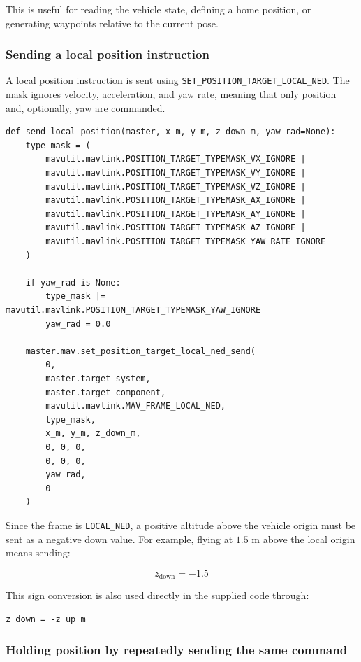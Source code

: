 This is useful for reading the vehicle state, defining a home position, or generating waypoints relative to the current pose. 

\subsubsection{Sending a local position instruction}

A local position instruction is sent using \texttt{SET\_POSITION\_TARGET\_LOCAL\_NED}. The mask ignores velocity, acceleration, and yaw rate, meaning that only position and, optionally, yaw are commanded.

\begin{verbatim}
def send_local_position(master, x_m, y_m, z_down_m, yaw_rad=None):
    type_mask = (
        mavutil.mavlink.POSITION_TARGET_TYPEMASK_VX_IGNORE |
        mavutil.mavlink.POSITION_TARGET_TYPEMASK_VY_IGNORE |
        mavutil.mavlink.POSITION_TARGET_TYPEMASK_VZ_IGNORE |
        mavutil.mavlink.POSITION_TARGET_TYPEMASK_AX_IGNORE |
        mavutil.mavlink.POSITION_TARGET_TYPEMASK_AY_IGNORE |
        mavutil.mavlink.POSITION_TARGET_TYPEMASK_AZ_IGNORE |
        mavutil.mavlink.POSITION_TARGET_TYPEMASK_YAW_RATE_IGNORE
    )

    if yaw_rad is None:
        type_mask |= mavutil.mavlink.POSITION_TARGET_TYPEMASK_YAW_IGNORE
        yaw_rad = 0.0

    master.mav.set_position_target_local_ned_send(
        0,
        master.target_system,
        master.target_component,
        mavutil.mavlink.MAV_FRAME_LOCAL_NED,
        type_mask,
        x_m, y_m, z_down_m,
        0, 0, 0,
        0, 0, 0,
        yaw_rad,
        0
    )
\end{verbatim}

Since the frame is \texttt{LOCAL\_NED}, a positive altitude above the vehicle origin must be sent as a negative down value. For example, flying at \(1.5\) m above the local origin means sending:

\[
z_{\text{down}} = -1.5
\]

This sign conversion is also used directly in the supplied code through:
\begin{verbatim}
z_down = -z_up_m
\end{verbatim}

\subsubsection{Holding position by repeatedly sending the same command}

